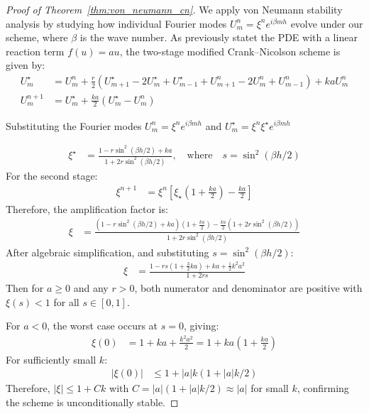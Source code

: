 \begin{proof}[Proof of Theorem~\ref{thm:von_neumann_cn}]

  We apply von Neumann stability analysis by studying how individual Fourier modes $U_m^n = \xi^n e^{i\beta mh}$
  evolve under our scheme, where $\beta$ is the wave number.
  \medskip
  As previously statet the PDE with a linear reaction term $f(u) = au$, the two-stage modified Crank--Nicolson
  scheme is given by:
  \begin{align*}
    U_m^\star & = U_m^n + \frac{r}{2}\left(U_{m+1}^\star - 2U_m^\star + U_{m-1}^\star + U_{m+1}^n - 2U_m^n + U_{m-1}^n\right) + kaU_m^n \\
    U_m^{n+1} & = U_m^\star + \frac{ka}{2}(U_m^\star - U_m^n)
  \end{align*}

  Substituting the Fourier modes $U_m^n = \xi^n e^{i\beta mh}$ and $U_m^\star = \xi^n \xi^\star e^{i\beta mh}$
  
  \begin{align*}
    \xi^\star & = \frac{1 - r\sin^2(\beta h/2) + ka}{1 + 2r\sin^2(\beta h/2)}, \quad \text{where}\quad s = \sin^2(\beta h/2)
  \end{align*}
  For the second stage:
  \begin{align*}
    \xi^{n+1} & = \xi^n\left[\xi_\star\left(1 + \frac{ka}{2}\right) - \frac{ka}{2}\right]
  \end{align*}
  Therefore, the amplification factor is:
  \begin{align*}
    \xi & = \frac{\left(1 - r\sin^2(\beta h/2) + ka\right)\left(1 + \frac{ka}{2}\right) - \frac{ka}{2}\left(1 + 2r\sin^2(\beta h/2)\right)}{1 + 2r\sin^2(\beta h/2)}
  \end{align*}
  After algebraic simplification, and substituting $s = \sin^2(\beta h/2)$:
  \begin{align*}
    \xi & = \frac{1 - rs(1 + \tfrac{3}{2}ka) + ka + \tfrac{1}{2}k^2a^2}{1 + 2rs}
  \end{align*}
  Then for $a \geq 0$ and any $r > 0$, both numerator and denominator are positive with $\xi(s) < 1$ for all
  $s \in [0,1]$.

  For $a < 0$, the worst case occurs at $s = 0$, giving:
  \begin{align*}
    \xi(0) & = 1 + ka + \frac{k^2a^2}{2} = 1 + ka\left(1 + \frac{ka}{2}\right)
  \end{align*}
  For sufficiently small $k$:
  \begin{align*}
    |\xi(0)| & \leq 1 + |a|k(1 + |a|k/2)
  \end{align*}
  Therefore, $|\xi| \leq 1 + Ck$ with $C = |a|(1 + |a|k/2) \approx |a|$ for small $k$, confirming the scheme is unconditionally stable.
\end{proof}
\clearpage
